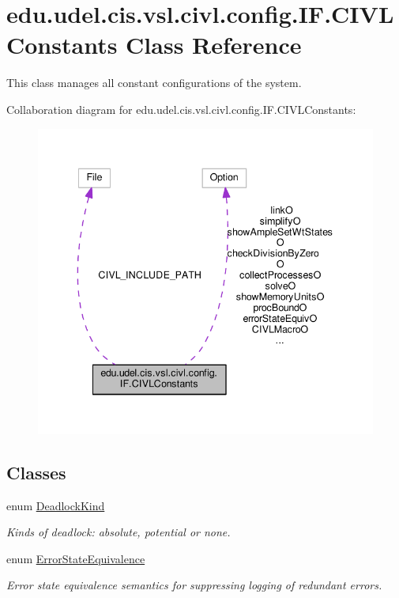 \hypertarget{classedu_1_1udel_1_1cis_1_1vsl_1_1civl_1_1config_1_1IF_1_1CIVLConstants}{}\section{edu.\+udel.\+cis.\+vsl.\+civl.\+config.\+I\+F.\+C\+I\+V\+L\+Constants Class Reference}
\label{classedu_1_1udel_1_1cis_1_1vsl_1_1civl_1_1config_1_1IF_1_1CIVLConstants}


This class manages all constant configurations of the system.  




Collaboration diagram for edu.\+udel.\+cis.\+vsl.\+civl.\+config.\+I\+F.\+C\+I\+V\+L\+Constants\+:
\nopagebreak
\begin{figure}[H]
\begin{center}
\leavevmode
\includegraphics[width=340pt]{classedu_1_1udel_1_1cis_1_1vsl_1_1civl_1_1config_1_1IF_1_1CIVLConstants__coll__graph}
\end{center}
\end{figure}
\subsection*{Classes}
\begin{DoxyCompactItemize}
\item 
enum \hyperlink{enumedu_1_1udel_1_1cis_1_1vsl_1_1civl_1_1config_1_1IF_1_1CIVLConstants_1_1DeadlockKind}{Deadlock\+Kind}
\begin{DoxyCompactList}\small\item\em Kinds of deadlock\+: absolute, potential or none. \end{DoxyCompactList}\item 
enum \hyperlink{enumedu_1_1udel_1_1cis_1_1vsl_1_1civl_1_1config_1_1IF_1_1CIVLConstants_1_1ErrorStateEquivalence}{Error\+State\+Equivalence}
\begin{DoxyCompactList}\small\item\em Error state equivalence semantics for suppressing logging of redundant errors. \end{DoxyCompactList}\end{DoxyCompactItemize}
